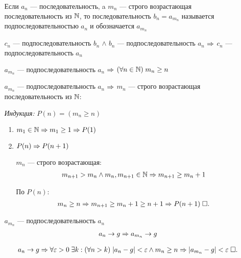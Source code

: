 \documentclass{article}
\begin{document}


Если $a_{n}$ --- последовательность, a $m_{n}$ --- строго возрастающая последовательность из $\mathbb{N}$, то последовательность $b_{n}=a_{m_{n}}$ называется подпоследовательностью $a_{n}$ и обозначается $a_{m_{n}}$

$c_{n}$ --- подпоследовательность $b_{n}$ $\land$ $b_{n}$ --- подпоследовательность $a_{n}$ $\Rightarrow$ $c_{n}$ --- подпоследовательность $a_{n}$

\lemma

$a_{m_{n}}$ --- подпоследовательность $a_{n}$ $\Rightarrow$ $(\forall n\in\mathbb{N})\;m_{n}\geq n$

\proof

$a_{m_{n}}$ --- подпоследовательность $a_{n}$ $\Rightarrow$ $m_{n}$ --- строго возрастающая последовательность из $\mathbb{N}$:

{\it Индукция:} $P(n)=(m_{n}\geq n)$
\begin{enumerate}
	\item{}$m_1\in\mathbb{N}\Rightarrow m_1\geq 1\Rightarrow P(1)$
	\item{}$P(n)\Rightarrow P(n+1)$

	$m_{n}$ --- строго возрастающая:
	\begin{align*}
		m_{n+1}>m_{n}\land m_{n},m_{n+1}\in\mathbb{N}\Rightarrow m_{n+1}\geq m_{n}+1
	\end{align*}

	По $P(n)$:
	\begin{align*}
		m_{n}\geq n\Rightarrow m_{n+1}\geq m_{n}+1\geq n+1\Rightarrow P(n+1)\;\square.
	\end{align*}

\end{enumerate}


\theorem

$a_{m_{n}}$ --- подпоследовательность $a_{n}$
\begin{align*}
	a_{n}\to g\Rightarrow a_{m_{n}}\to g
\end{align*}

\proof
\begin{align*}
	a_{n}\to g\Rightarrow\forall\varepsilon>0\;\exists k:(\forall n>k)\;|a_{n}-g|<\varepsilon\land m_{n}\geq n\Rightarrow |a_{m_{n}}-g|<\varepsilon\;\square.
\end{align*}
\end{document}
